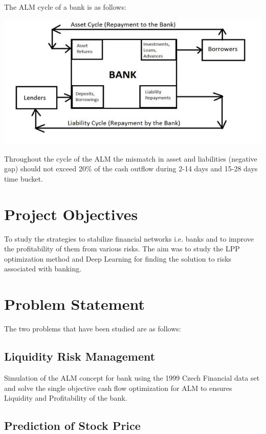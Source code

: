 		The ALM cycle of a bank is as follows:

		\begin{center}
		\includegraphics[width=\linewidth]{figures/ALM_Cycle_of_a_Bank.jpg}	
		\label{fig:ALM Cycle of a Bank}
		\end{center}

		Throughout the cycle of the ALM the mismatch in asset and liabilities (negative gap) should not exceed 20\% of the cash outflow during 2-14 days and 15-28 days time bucket.

	
\section{Project Objectives}

	To study the strategies to stabilize financial networks i.e. banks and to improve the profitability of them from various risks. The aim was to study the LPP optimization method and Deep Learning for finding the solution to risks associated with banking.

\section{Problem Statement}

	The two problems that have been studied are as follows:
	\subsection{Liquidity Risk Management}

Simulation of the ALM concept for bank using the 1999 Czech Financial data set and solve the single objective cash flow optimization for ALM to ensures Liquidity and Profitability of the bank. 

	\subsection{Prediction of Stock Price}

